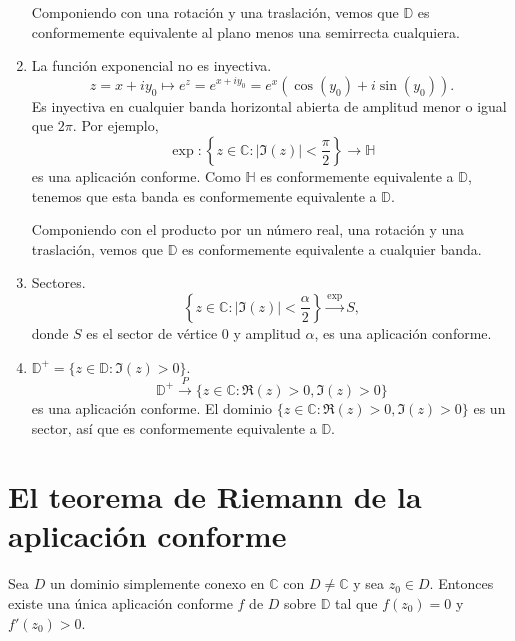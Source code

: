 \begin{example}
\begin{enumerate}
              Componiendo con una rotación y una traslación, vemos que $\mathbb{D}$ es conformemente equivalente al plano menos una semirrecta cualquiera.
        \item La función exponencial no es inyectiva.
              $$z = x + iy_0 \mapsto e^z = e^{x + iy_0} = e^x(\cos(y_0) + i\sin(y_0)).$$
              Es inyectiva en cualquier banda horizontal abierta de amplitud menor o igual que $2\pi$.
              Por ejemplo,
              $$\exp: \left\{z \in \mathbb{C} : |\Im(z)| < \frac{\pi}{2}\right\} \to \mathbb{H}$$
              es una aplicación conforme.
              Como $\mathbb{H}$ es conformemente equivalente a $\mathbb{D}$, tenemos que esta banda es conformemente equivalente a $\mathbb{D}$.

              Componiendo con el producto por un número real, una rotación y una traslación, vemos que $\mathbb{D}$ es conformemente equivalente a cualquier banda.
        \item Sectores.
              $$\left\{z \in \mathbb{C} : |\Im(z)| < \frac{\alpha}{2}\right\} \xrightarrow{\exp} S,$$
              donde $S$ es el sector de vértice 0 y amplitud $\alpha$, es una aplicación conforme.
        \item $\mathbb{D}^+ = \{z \in \mathbb{D} : \Im(z) > 0\}$.
              $$\mathbb{D}^+ \xrightarrow{P} \{z \in \mathbb{C} : \Re(z) > 0, \Im(z) > 0\}$$
              es una aplicación conforme. El dominio $\{z \in \mathbb{C} : \Re(z) > 0, \Im(z) > 0\}$ es un sector, así que es conformemente equivalente a $\mathbb{D}$.
    \end{enumerate}
\end{example}

\section{El teorema de Riemann de la aplicación conforme}
\begin{theorem}
    Sea $D$ un dominio simplemente conexo en $\mathbb{C}$ con $D \neq \mathbb{C}$ y sea $z_0 \in D$.
    Entonces existe una única aplicación conforme $f$ de $D$ sobre $\mathbb{D}$ tal que $f(z_0) = 0$ y $f'(z_0) > 0$.
\end{theorem}

